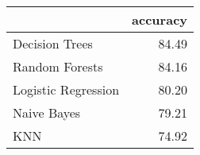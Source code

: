 \begin{tabular}{lr}
\toprule
{} &  accuracy \\
\midrule
Decision Trees      &     84.49 \\
Random Forests      &     84.16 \\
Logistic Regression &     80.20 \\
Naive Bayes         &     79.21 \\
KNN                 &     74.92 \\
\bottomrule
\end{tabular}

